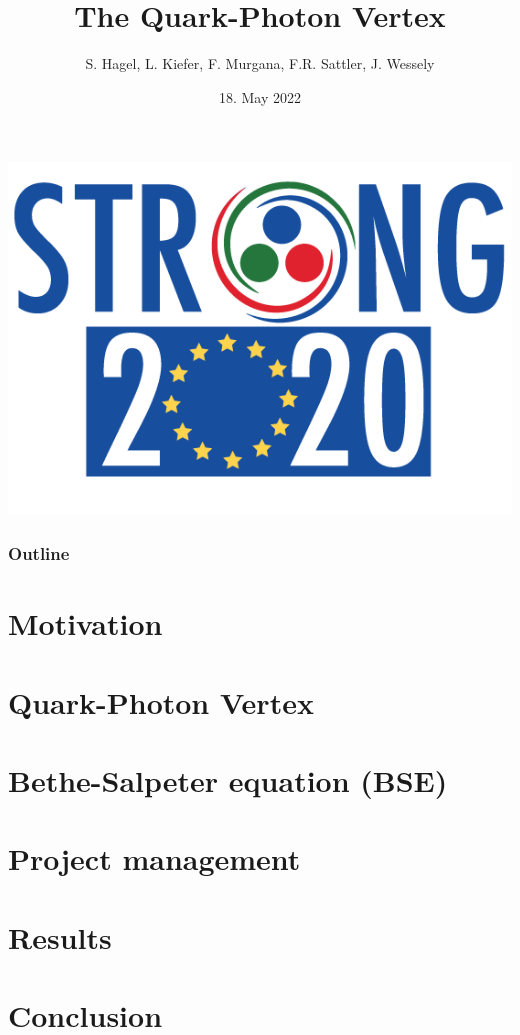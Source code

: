 \documentclass[pt12]{beamer}
\title[ECT* DTP 2022]{The Quark-Photon Vertex}
\author{S. Hagel, L. Kiefer, F. Murgana, F.R. Sattler, J. Wessely}
\date{18. May 2022}
\begin{document}
  \begin{frame}[plain]
    \titlepage
    \begin{center}
      \includegraphics[width=0.45\linewidth]{graphics/Logo_STRONG_vert- trasparente}
    \end{center}
  \end{frame}

  \begin{frame}[label=outline]\frametitle{Outline}
    \tableofcontents
  \end{frame}

  \section{Motivation}\label{sec:1}
  


  \section{Quark-Photon Vertex}\label{sec:2}
    

  \section{Bethe-Salpeter equation (BSE)}\label{sec:3}
    
    
    
    

  \section{Project management}\label{sec:4}
    

  \section{Results}\label{sec:5}
    

  \section{Conclusion}\label{sec:6}
    
\end{document}

